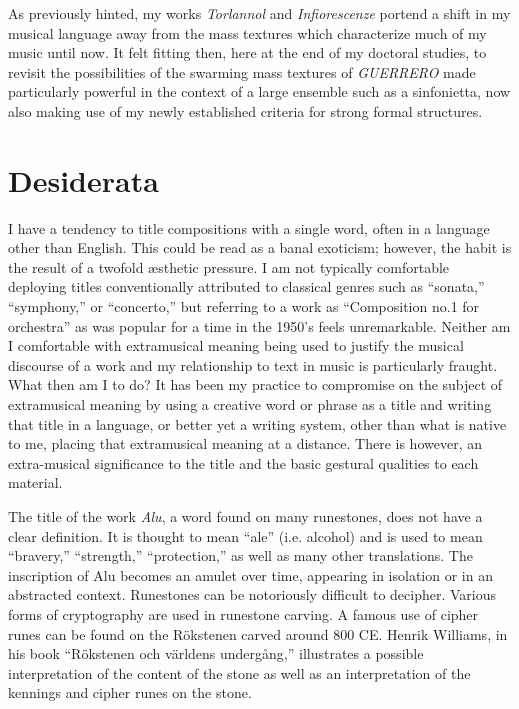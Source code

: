 As previously hinted, my works \textit{Torlannol} and \textit{Infiorescenze} portend a shift in my musical language away from the mass textures which characterize much of my music until now. It felt fitting then, here at the end of my doctoral studies, to revisit the possibilities of the swarming mass textures of \textit{GUERRERO} made particularly powerful in the context of a large ensemble such as a sinfonietta, now also making use of my newly established criteria for strong formal structures.

\section{Desiderata}

I have a tendency to title compositions with a single word, often in a language other than English. This could be read as a banal exoticism; however, the habit is the result of a twofold æsthetic pressure. I am not typically comfortable deploying titles conventionally attributed to classical genres such as ``sonata,'' ``symphony,'' or ``concerto,'' but referring to a work as ``Composition no.1 for orchestra'' as was popular for a time in the 1950's feels unremarkable. Neither am I comfortable with extramusical meaning being used to justify the musical discourse of a work and my relationship to text in music is particularly fraught. What then am I to do? It has been my practice to compromise on the subject of extramusical meaning by using a creative word or phrase as a title and writing that title in a language, or better yet a writing system, other than what is native to me, placing that extramusical meaning at a distance. There is however, an extra-musical significance to the title and the basic gestural qualities to each material.

The title of the work \textit{Alu}, a word found on many runestones, does not have a clear definition. It is thought to mean ``ale'' (i.e. alcohol) and is used to mean ``bravery,'' ``strength,'' ``protection,'' as well as many other translations. The inscription of Alu becomes an amulet over time, appearing in isolation or in an abstracted context. Runestones can be notoriously difficult to decipher. Various forms of cryptography are used in runestone carving. A famous use of cipher runes can be found on the Rökstenen carved around 800 CE. Henrik Williams, in his book ``Rökstenen och världens undergång,'' illustrates a possible interpretation of the content of the stone as well as an interpretation of the kennings and cipher runes on the stone.

